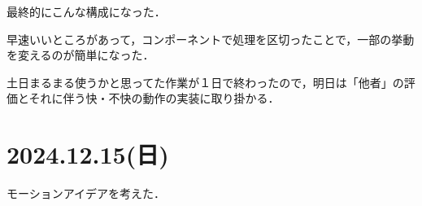 \documentclass[fleqn,twocolumn]{mynote}
\begin{document}
最終的にこんな構成になった．

\fboxsep=0pt            %
\fboxrule=1pt            %
\begin{figure}[h]
  \centering
  \caption{}
  \label{fig:}
\end{figure}

早速いいところがあって，コンポーネントで処理を区切ったことで，一部の挙動を変えるのが簡単になった．

土日まるまる使うかと思ってた作業が１日で終わったので，明日は「他者」の評価とそれに伴う快・不快の動作の実装に取り掛かる．

\section*{2024.12.15(日)}
モーションアイデアを考えた．

\fboxsep=0pt            %
\fboxrule=1pt            %
\begin{figure}[h]
  \centering
  \caption{}
  \label{fig:}
\end{figure}
\end{document}
